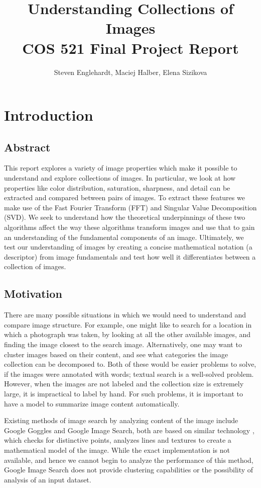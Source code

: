 \documentclass{report}
\author{Steven Englehardt, Maciej Halber, Elena Sizikova}
\title{Understanding Collections of Images \\ \small{COS 521 Final Project Report}}
\begin{document}
\maketitle
\tableofcontents

\chapter{Introduction}
\section{Abstract}
This report explores a variety of image properties which make it possible to understand and explore collections of images. In particular, we look at how properties like color distribution, saturation, sharpness, and detail can be extracted and compared between pairs of images. To extract these features we make use of the Fast Fourier Transform (FFT) and Singular Value Decomposition (SVD). We seek to understand how the theoretical underpinnings of these two algorithms affect the way these algorithms transform images and use that to gain an understanding of the fundamental components of an image. Ultimately, we test our understanding of images by creating a concise mathematical notation (a descriptor) from image fundamentals and test how well it differentiates between a collection of images.

\section{Motivation}

There are many possible situations in which we would need to understand and compare image structure. For example, one might like to search for a location in which a photograph was taken, by looking at all the other available images, and finding the image closest to the search image. Alternatively, one may want to cluster images based on their content, and see what categories the image collection can be decomposed to. Both of these would be easier problems to solve, if the images were annotated with words; textual search is a well-solved problem. However, when the images are not labeled and the collection size is extremely large, it is impractical to label by hand. For such problems, it is important to have a model to summarize image content automatically.

Existing methods of image search by analyzing content of the image include Google Goggles and Google Image Search, both are based on similar technology \cite{google_blog}, which checks for distinctive points, analyzes lines and textures to create a mathematical model of the image. While the exact implementation is not available, and hence we cannot begin to analyze the performance of this method, Google Image Search does not provide clustering capabilities or the possibility of analysis of an input dataset.
\end{document}
